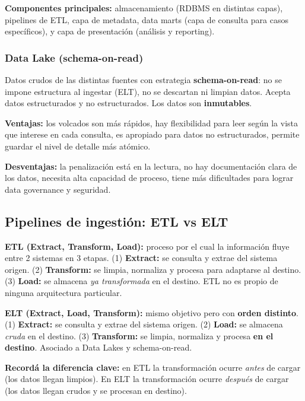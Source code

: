 \documentclass[11pt, a4paper]{article}
\begin{document}
\textbf{Componentes principales:} almacenamiento (RDBMS en distintas capas), pipelines de ETL, capa de metadata, data marts (capa de consulta para casos específicos), y capa de presentación (análisis y reporting).

\subsubsection{Data Lake (schema-on-read)}

Datos crudos de las distintas fuentes con estrategia \textbf{schema-on-read}: no se impone estructura al ingestar (ELT), no se descartan ni limpian datos. Acepta datos estructurados y no estructurados. Los datos son \textbf{inmutables}.

\textbf{Ventajas:} los volcados son más rápidos, hay flexibilidad para leer según la vista que interese en cada consulta, es apropiado para datos no estructurados, permite guardar el nivel de detalle más atómico.

\textbf{Desventajas:} la penalización está en la lectura, no hay documentación clara de los datos, necesita alta capacidad de proceso, tiene más dificultades para lograr data governance y seguridad.

\subsection{Pipelines de ingestión: ETL vs ELT}

\textbf{ETL (Extract, Transform, Load):} proceso por el cual la información fluye entre 2 sistemas en 3 etapas. (1) \textbf{Extract:} se consulta y extrae del sistema origen. (2) \textbf{Transform:} se limpia, normaliza y procesa para adaptarse al destino. (3) \textbf{Load:} se almacena \textit{ya transformada} en el destino. ETL no es propio de ninguna arquitectura particular.

\textbf{ELT (Extract, Load, Transform):} mismo objetivo pero con \textbf{orden distinto}. (1) \textbf{Extract:} se consulta y extrae del sistema origen. (2) \textbf{Load:} se almacena \textit{cruda} en el destino. (3) \textbf{Transform:} se limpia, normaliza y procesa \textbf{en el destino}. Asociado a Data Lakes y schema-on-read.

\begin{recallbox}
	\textbf{Recordá la diferencia clave:} en ETL la transformación ocurre \textit{antes} de cargar (los datos llegan limpios). En ELT la transformación ocurre \textit{después} de cargar (los datos llegan crudos y se procesan en destino).
\end{recallbox}
\end{document}
